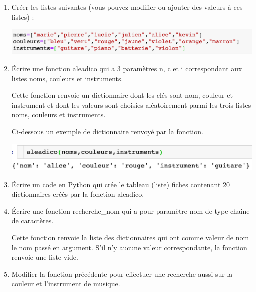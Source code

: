 \documentclass[11pt,a4paper]{article}
\begin{document}
\begin{enumerate}
\item Créer les listes suivantes (vous pouvez modifier ou ajouter des valeurs à ces listes) :

\begin{center}
\includegraphics[scale=0.6]{img/dicoliste1.eps}
\end{center}

\item Écrire une fonction \textsf{aleadico} qui a 3 paramètres \textsf{n}, \textsf{c} et \textsf{i} correspondant aux listes \textsf{noms}, \textsf{couleurs} et \textsf{instruments}.

Cette fonction renvoie un dictionnaire dont les clés sont \textsf{nom}, \textsf{couleur} et \textsf{instrument} et dont les valeurs sont choisies aléatoirement parmi les trois listes \textsf{noms}, \textsf{couleurs} et \textsf{instruments}.

Ci-dessous un exemple de dictionnaire renvoyé par la fonction.

\begin{center}
\includegraphics[scale=0.6]{img/dicoliste2.eps}
\end{center}

\item Écrire un code en Python qui crée le tableau (liste) \textsf{fiches} contenant 20 dictionnaires créés par la fonction \textsf{aleadico}. 

\item Écrire une fonction \textsf{recherche\_nom} qui a pour paramètre \textsf{nom} de type chaine de caractères. 

Cette fonction renvoie la liste des dictionnaires qui ont comme valeur de nom le nom passé en argument. S'il n'y aucune valeur correspondante, la fonction renvoie une liste vide.

\item Modifier la fonction précédente pour effectuer une recherche aussi sur la couleur et l'instrument de musique. 


\end{enumerate}
\end{document}
